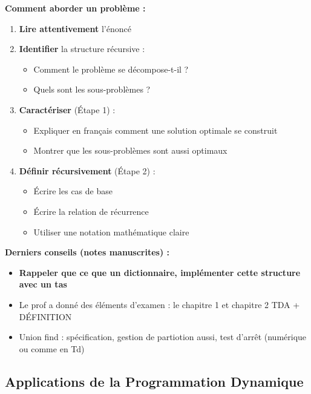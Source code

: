 \documentclass[12pt,a4paper]{article}
\begin{document}
\begin{algorithme}
\textbf{Comment aborder un problème :}

\begin{enumerate}
    \item \textbf{Lire attentivement} l'énoncé
    
    \item \textbf{Identifier} la structure récursive :
    \begin{itemize}
        \item Comment le problème se décompose-t-il ?
        \item Quels sont les sous-problèmes ?
    \end{itemize}
    
    \item \textbf{Caractériser} (Étape 1) :
    \begin{itemize}
        \item Expliquer en français comment une solution optimale se construit
        \item Montrer que les sous-problèmes sont aussi optimaux
    \end{itemize}
    
    \item \textbf{Définir récursivement} (Étape 2) :
    \begin{itemize}
        \item Écrire les cas de base
        \item Écrire la relation de récurrence
        \item Utiliser une notation mathématique claire
    \end{itemize}
\end{enumerate}
\end{algorithme}

\begin{notecours}
\textbf{Derniers conseils (notes manuscrites) :}
\begin{itemize}
    \item \textbf{Rappeler que ce que un dictionnaire, implémenter cette structure avec un tas}
    \item Le prof a donné des éléments d'examen : le chapitre 1 et chapitre 2 TDA + DÉFINITION
    \item Union find : spécification, gestion de partiotion aussi, test d'arrêt (numérique ou comme en Td)
\end{itemize}
\end{notecours}

\subsection{Applications de la Programmation Dynamique}
\end{document}
